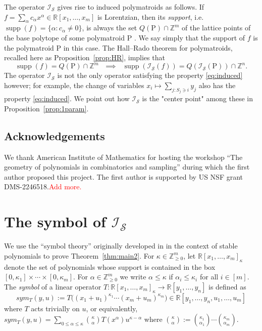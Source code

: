 \documentclass{amsart}
\newcommand{\RR}{\mathbb R}
\newcommand{\ZZ}{\mathbb Z}
\renewcommand{\P}{\mathrm{P}}
\theoremstyle{plain}
\theoremstyle{definition}
\begin{document}
\smallskip
The operator $\mathcal I_{\mathcal S}$ gives rise to induced polymatroids as follows.
If $f  = \sum_{\alpha} c_\alpha x^\alpha \in \RR[x_1, \dotsc, x_m]$ is Lorentzian, then its \emph{support}, i.e.\ $\operatorname{supp}(f) = \{\alpha : c_\alpha \neq 0\}$, is always the set $Q(\P) \cap \ZZ^m$ of the lattice points of the base polytope of some polymatroid $\P$ \cite[Theorem~2.25]{BH20}.
We say simply that the support of $f$ is the polymatroid $\P$ in this case.
The Hall--Rado theorem for polymatroids, recalled here as Proposition~\ref{prop:HR}, implies that 
\begin{equation*}\tag{$*$}\label{eq:induced}
\text{$\operatorname{supp}(f) = Q(\P) \cap \ZZ^m$ $\implies$ $\operatorname{supp}(\mathcal I_{\mathcal S}(f)) = Q(\mathcal I_{\mathcal S}(\P)) \cap \ZZ^n$}.
\end{equation*}
The operator $\mathcal I_{\mathcal S}$ is not the only operator satisfying the property \eqref{eq:induced} however; for example, the change of variables $x_i \mapsto \sum_{j: S_j \ni i} y_j$ also has the property \eqref{eq:induced}.
We point out how $\mathcal I_{\mathcal S}$ is the "center point" among these in Proposition~\ref{prop:1param}.

\subsection*{Acknowledgements}
We thank American Institute of Mathematics for hosting the workshop ``The geometry of polynomials in combinatorics and sampling'' during which the first author proposed this project.  The first author is supported by US NSF grant DMS-2246518.\textcolor{red}{Add more.}


\section{The symbol of $\mathcal I_{\mathcal S}$}\label{sec:symbol}

We use the ``symbol theory'' originally developed in \cite{BB09} in the context of stable polynomials to prove Theorem~\ref{thm:main2}.
For $\kappa \in \ZZ_{\geq 0}^m$, let $\RR[x_1, \dotsc, x_m]_\kappa$ denote the set of polynomials whose support is contained in the box $[0,\kappa_1] \times \dotsb \times [0, \kappa_m]$.  For $\alpha\in \ZZ_{\geq 0}^m$ we write $\alpha \leq \kappa$ if $\alpha_i \leq \kappa_i$ for all $i \in [m]$.  The \emph{symbol} of a linear operator $T: \RR[x_1, \dotsc, x_m]_\kappa \to \RR[y_1, \dotsc, y_n]$ is defined as
\[
sym_T(y,u) := T\big((x_1+u_1)^{\kappa_1}\dotsb (x_m+u_m)^{\kappa_m}\big) \in \RR[y_1,\ldots,y_n,u_1,\ldots,u_m]
\]
where $T$ acts trivially on $u$, or equivalently, $sym_T(y,u) = \sum_{0\leq \alpha\leq  \kappa} \binom{\kappa}{\alpha}T(x^\alpha) u^{\kappa - \alpha}$ where $\binom{\kappa}{\alpha} := \binom{\kappa_1}{\alpha_1} \dotsb \binom{\kappa_m}{\alpha_m}$.
\end{document}
